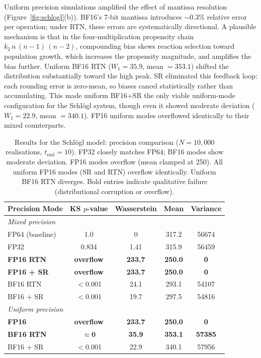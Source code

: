 \documentclass{article}
\begin{document}
Uniform precision simulations amplified the effect of mantissa resolution (Figure~\ref{fig:schlogl}(b)). BF16's 7-bit mantissa introduces $\sim$0.3\% relative error per operation; under RTN, these errors are systematically directional. A plausible mechanism is that in the four-multiplication propensity chain $k_2 \, n \, (n{-}1) \, (n{-}2)$, compounding bias skews reaction selection toward population growth, which increases the propensity magnitude, and amplifies the bias further. Uniform BF16 RTN ($W_1 = 35.9$, mean $= 353.1$) shifted the distribution substantially toward the high peak. SR eliminated this feedback loop: each rounding error is zero-mean, so biases cancel statistically rather than accumulating. This made uniform BF16+SR the only viable uniform-mode configuration for the Schl\"{o}gl system, though even it showed moderate deviation ($W_1 = 22.9$, mean $= 340.1$). FP16 uniform modes overflowed identically to their mixed counterparts.

\begin{table}[ht]
    \centering
    \begin{tabular}{@{}lcccc@{}}
        \toprule
        Precision Mode & KS $p$-value & Wasserstein & Mean & Variance \\
        \midrule
        \multicolumn{5}{l}{\textit{Mixed precision}} \\
        \midrule
        FP64 (baseline)   & 1.0    & 0      & 317.2 & 56674 \\
        FP32              & 0.834  & 1.41   & 315.9 & 56459 \\
        \textbf{FP16 RTN} & \textbf{overflow} & \textbf{233.7} & \textbf{250.0} & \textbf{0} \\
        \textbf{FP16 + SR} & \textbf{overflow} & \textbf{233.7} & \textbf{250.0} & \textbf{0} \\
        BF16 RTN          & $<$0.001 & 24.1 & 293.1 & 54107 \\
        BF16 + SR         & $<$0.001 & 19.7 & 297.5 & 54816 \\
        \midrule
        \multicolumn{5}{l}{\textit{Uniform precision}} \\
        \midrule
        \textbf{FP16} & \textbf{overflow} & \textbf{233.7} & \textbf{250.0} & \textbf{0} \\
        \textbf{BF16 RTN} & $\mathbf{\approx 0}$ & \textbf{35.9} & \textbf{353.1} & \textbf{57385} \\
        BF16 + SR  & $<$0.001 & 22.9 & 340.1 & 57956 \\
        \bottomrule
    \end{tabular}
    \caption{Results for the Schl\"{o}gl model: precision comparison ($N = 10{,}000$ realisations, $t_{\mathrm{end}} = 10$). FP32 closely matches FP64; BF16 modes show moderate deviation. FP16 modes overflow (mean clamped at 250). All uniform FP16 modes (SR and RTN) overflow identically. Uniform BF16 RTN diverges. Bold entries indicate qualitative failure (distributional corruption or overflow).}
    \label{tab:schlogl}
\end{table}
\end{document}
